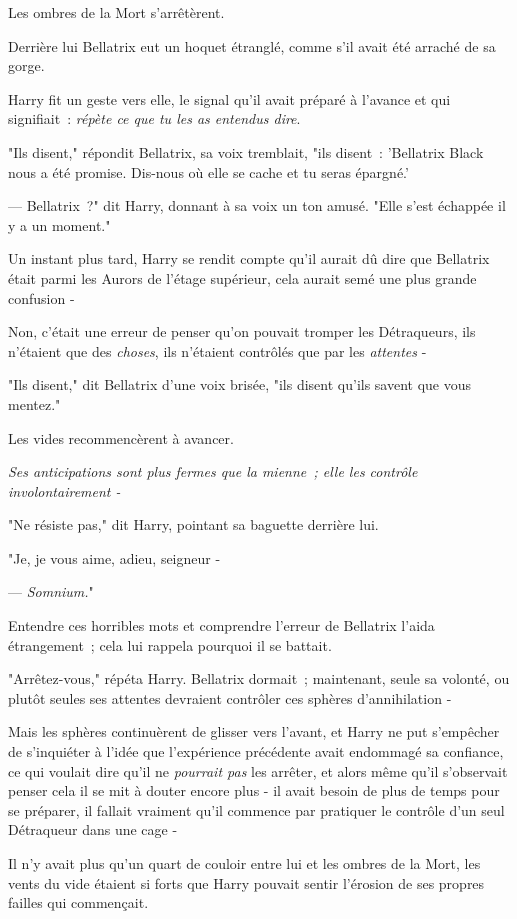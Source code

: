 Les ombres de la Mort s'arrêtèrent.

Derrière lui Bellatrix eut un hoquet étranglé, comme s'il avait été arraché de sa gorge.

Harry fit un geste vers elle, le signal qu'il avait préparé à l'avance et qui signifiait~: \emph{répète ce que tu les as entendus dire}.

"Ils disent," répondit Bellatrix, sa voix tremblait, "ils disent~: 'Bellatrix Black nous a été promise. Dis-nous où elle se cache et tu seras épargné.'

--- Bellatrix~?" dit Harry, donnant à sa voix un ton amusé. "Elle s'est échappée il y a un moment."

Un instant plus tard, Harry se rendit compte qu'il aurait dû dire que Bellatrix était parmi les Aurors de l'étage supérieur, cela aurait semé une plus grande confusion -

Non, c'était une erreur de penser qu'on pouvait tromper les Détraqueurs, ils n'étaient que des \emph{choses}, ils n'étaient contrôlés que par les \emph{attentes} -

"Ils disent," dit Bellatrix d'une voix brisée, "ils disent qu'ils savent que vous mentez."

Les vides recommencèrent à avancer.

\emph{Ses anticipations sont plus fermes que la mienne~; elle les contrôle involontairement -}

"Ne résiste pas," dit Harry, pointant sa baguette derrière lui.

"Je, je vous aime, adieu, seigneur -

--- \emph{Somnium.}"

Entendre ces horribles mots et comprendre l'erreur de Bellatrix l'aida étrangement~; cela lui rappela pourquoi il se battait.

"Arrêtez-vous," répéta Harry. Bellatrix dormait~; maintenant, seule sa volonté, ou plutôt seules ses attentes devraient contrôler ces sphères d'annihilation -

Mais les sphères continuèrent de glisser vers l'avant, et Harry ne put s'empêcher de s'inquiéter à l'idée que l'expérience précédente avait endommagé sa confiance, ce qui voulait dire qu'il ne \emph{pourrait pas} les arrêter, et alors même qu'il s'observait penser cela il se mit à douter encore plus - il avait besoin de plus de temps pour se préparer, il fallait vraiment qu'il commence par pratiquer le contrôle d'un seul Détraqueur dans une cage -

Il n'y avait plus qu'un quart de couloir entre lui et les ombres de la Mort, les vents du vide étaient si forts que Harry pouvait sentir l'érosion de ses propres failles qui commençait.


